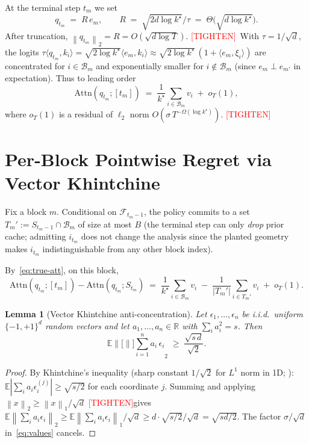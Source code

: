 \documentclass{article}
\newtheorem{lemma}[theorem]{Lemma}
\theoremstyle{definition}
\theoremstyle{remark}
\newcommand{\R}{\mathbb{R}}
\newcommand{\E}{\mathbb{E}}
\newcommand{\F}{\mathcal{F}}
\newcommand{\Bset}{\mathcal{B}}
\newcommand{\Attn}{\mathrm{Attn}}
\newcommand{\inner}[2]{\langle #1, #2 \rangle}
\newcommand{\norm}[1]{\left\lVert #1 \right\rVert}
\newcommand{\tighten}{\textcolor{red}{[TIGHTEN]}}
\begin{document}
At the terminal step $t_m$ we set
\begin{equation}\label{eq:terminal-q}
q_{t_m} \;=\; R\,e_m,\qquad R \;=\; \sqrt{2 d\log k^\star}/\tau \;=\; \Theta\!\bigl(\sqrt{d\log k^\star}\bigr).
\end{equation}
After truncation, $\norm{q_{t_m}}_2=R=O(\sqrt{d\log T})$. \tighten\ With $\tau=1/\sqrt d$, the logits $\tau\inner{q_{t_m}}{k_i}=\sqrt{2\log k^\star}\inner{e_m}{k_i}\approx \sqrt{2\log k^\star}\,(1+\inner{e_m}{\xi_i})$ are concentrated for $i\in\Bset_m$ and exponentially smaller for $i\not\in\Bset_m$ (since $e_m\perp e_{m'}$ in expectation). Thus to leading order
\begin{equation}\label{eq:true-att}
\Attn(q_{t_m};[t_m]) \;=\; \frac{1}{k^\star}\sum_{i\in\Bset_m}v_i \;+\; o_T(1),
\end{equation}
where $o_T(1)$ is a residual of $\ell_2$ norm $O(\sigma\,T^{-\Omega(\log k^\star)})$. \tighten

\section{Per-Block Pointwise Regret via Vector Khintchine}
\label{sec:pointwise}

Fix a block $m$. Conditional on $\F_{t_m-1}$, the policy commits to a set $T_m':=S_{t_m-1}\cap\Bset_m$ of size at most $B$ (the terminal step can only \emph{drop} prior cache; admitting $i_{t_m}$ does not change the analysis since the planted geometry makes $i_{t_m}$ indistinguishable from any other block index).

By~\eqref{eq:true-att}, on this block,
\[
\Attn(q_{t_m};[t_m]) - \Attn(q_{t_m};S_{t_m}) \;=\; \frac{1}{k^\star}\sum_{i\in\Bset_m}v_i \;-\; \frac{1}{|T_m'|}\sum_{i\in T_m'}v_i \;+\; o_T(1).
\]

\begin{lemma}[Vector Khintchine anti-concentration]\label{lem:khintchine}
Let $\epsilon_1,\dots,\epsilon_n$ be i.i.d.\ uniform $\{-1,+1\}^d$ random vectors and let $a_1,\dots,a_n\in\R$ with $\sum_i a_i^2=s$. Then
\[
\E\norm[\Big]{\sum_{i=1}^n a_i\,\epsilon_i}_2 \;\ge\; \frac{\sqrt{s\,d}}{\sqrt 2}.
\]
\end{lemma}
\begin{proof}
By Khintchine's inequality (sharp constant $1/\sqrt 2$ for $L^1$ norm in 1D; \citealp{haagerup1981best}): $\E|\sum_i a_i\epsilon_i^{(j)}|\ge\sqrt{s/2}$ for each coordinate $j$. Summing and applying $\norm{x}_2\ge\norm{x}_1/\sqrt d$ \tighten gives $\E\norm{\sum_i a_i\epsilon_i}_2\ge\E\norm{\sum_i a_i\epsilon_i}_1/\sqrt d\ge d\cdot\sqrt{s/2}/\sqrt d=\sqrt{sd/2}$. The factor $\sigma/\sqrt d$ in~\eqref{eq:values} cancels.
\end{proof}
\end{document}

